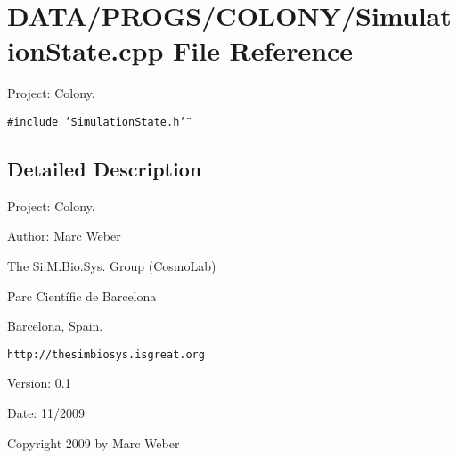 \section{DATA/PROGS/COLONY/SimulationState.cpp File Reference}
\label{SimulationState_8cpp}
Project: Colony. 

{\tt \#include \char`\"{}SimulationState.h\char`\"{}}\par


\subsection{Detailed Description}
Project: Colony. 

\begin{Desc}
\item[Author:]Marc Weber\par
 The Si.M.Bio.Sys. Group (CosmoLab)\par
 Parc Científic de Barcelona\par
 Barcelona, Spain.\par
 {\tt http://thesimbiosys.isgreat.org} \end{Desc}
\begin{Desc}
\item[Version:]0.1 \end{Desc}
\begin{Desc}
\item[Date:]11/2009\end{Desc}
Copyright 2009 by Marc Weber 